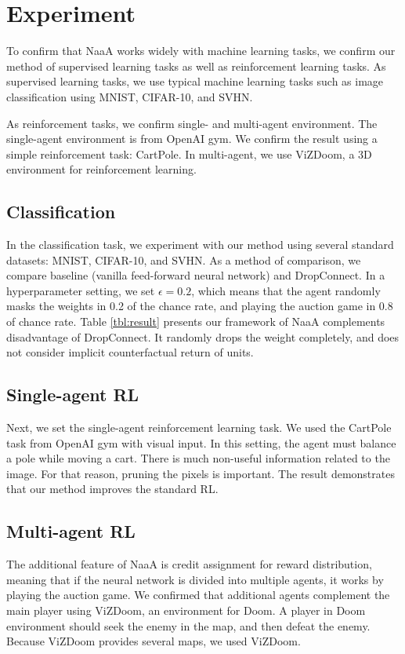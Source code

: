 \section{Experiment}
To confirm that NaaA works widely with machine learning tasks,
we confirm our method of supervised learning tasks as well as reinforcement learning tasks.
As supervised learning tasks, we use typical machine learning tasks such as image classification
using MNIST, CIFAR-10, and SVHN.

As reinforcement tasks, we confirm single- and multi-agent environment.
The single-agent environment is from OpenAI gym.
We confirm the result using a simple reinforcement task: CartPole.
In multi-agent, we use ViZDoom, a 3D environment for reinforcement learning.

\subsection{Classification}
In the classification task, we experiment with our method using several standard datasets: MNIST, CIFAR-10, and SVHN.
As a method of comparison, we compare baseline (vanilla feed-forward neural network) and DropConnect.
In a hyperparameter setting, we set $\epsilon = 0.2$, which means that the agent randomly masks the weights in 0.2 of the chance rate, 
and playing the auction game in 0.8 of chance rate.
Table \ref{tbl:result} presents our framework of NaaA complements disadvantage of DropConnect.
It randomly drops the weight completely, and does not consider implicit counterfactual return of units.

\subsection{Single-agent RL}
Next, we set the single-agent reinforcement learning task.
We used the CartPole task from OpenAI gym with visual input.
In this setting, the agent must balance a pole while moving a cart.
There is much non-useful information related to the image. For that reason, pruning the pixels is important.
The result demonstrates that our method improves the standard RL.

\subsection{Multi-agent RL}
The additional feature of NaaA is credit assignment for reward distribution, 
meaning that if the neural network is divided into multiple agents, it works by playing the auction game.
We confirmed that additional agents complement the main player using ViZDoom, an environment for Doom.
A player in Doom environment should seek the enemy in the map, and then defeat the enemy.
Because ViZDoom provides several maps, we used ViZDoom.

